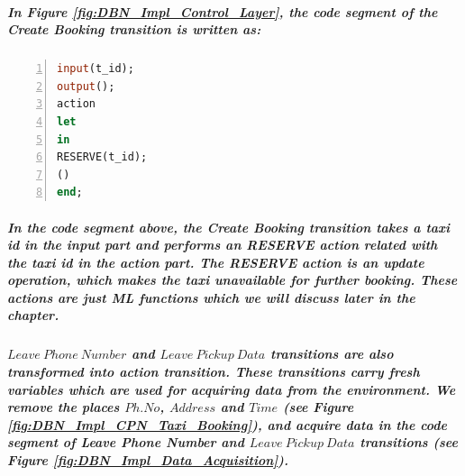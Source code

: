 \subparagraph*{\textnormal{In Figure \ref{fig:DBN_Impl_Control_Layer}, the code segment of the \textit{Create Booking} transition is written as:}}

\subparagraph*{}

\begin{lstlisting}[showstringspaces=false, language = ML, caption = Code Segment: \textit{Create Booking} transition, captionpos=b, label = lst:DBN_Impl_Create_Booking_code_segment, numbers=left,
stepnumber=1]
input(t_id);
output();
action
let
in
RESERVE(t_id);
()
end;
\end{lstlisting}

\subparagraph*{\textnormal{In the code segment above, the \textit{Create Booking} transition takes a taxi id in the input part and performs an \textit{RESERVE} action related with the taxi id in the action part. The \textit{RESERVE} action is an update operation, which makes the taxi unavailable for further booking. These actions are just ML functions which we will discuss later in the chapter.}}

%
%
%

\subparagraph*{\textnormal{$\mathit{Leave\ Phone\ Number}$ and $\mathit{Leave\ Pickup\ Data}$ transitions are also transformed into action transition. These transitions carry fresh variables which are used for acquiring data from the environment. We remove the places $\mathit{Ph. No}$, $\mathit{Address}$ and $\mathit{Time}$ (see Figure \ref{fig:DBN_Impl_CPN_Taxi_Booking}), and acquire data in the code segment of \textit{Leave Phone Number} and $\mathit{Leave\ Pickup\ Data}$ transitions (see Figure \ref{fig:DBN_Impl_Data_Acquisition}).}}

